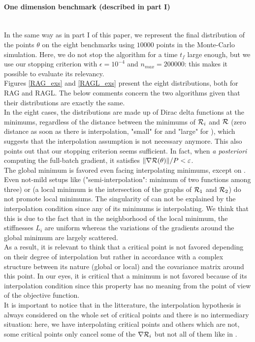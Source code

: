 \paragraph{One dimension benchmark (described in part I)}
~~\\
In the same way as in part I of this paper, we represent the final distribution of the points $\theta$ on the eight benchmarks using $10000$ points in the Monte-Carlo simulation. Here, we do not stop the algorithm for a time $t_f$ large enough, but we use our stopping criterion with $\epsilon=10^{-4}$ and $n_{max}=200000$: this makes it possible to evaluate its relevancy. 
\\
Figures \ref{RAG_exs} and \ref{RAGL_exs} present the eight distributions, both for RAG and RAGL. The below comments concern the two algorithms given that their distributions are exactly the same.\\
In the eight cases, the distributions are made up of Dirac delta functions at the minimums, regardless of the distance between the minimums of $\mathcal{R}_i$ and $\mathcal{R}$ (zero distance as
soon as there is interpolation, "small" for \exThree and "large" for \exFour), which suggests that the interpolation assumption is not necessary anymore. This also points out that
our stopping criterion seems sufficient. In fact, when {\em a posteriori} computing the full-batch gradient, it satisfies $\|\nabla \mathcal{R}(\theta)\|/P<\varepsilon$. \\
The global minimum is favored even facing interpolating minimums, except on \exHeight. Even not-mild setups like \exSix ("semi-interpolation": minimum of two functions among three) or \exThree (a local minimum is the intersection of the graphs of $\mathcal{R}_1$ and $\mathcal{R}_2$) do not promote local minimums. The singularity of \exHeight can not be explained by the interpolation condition since any of its minimums is interpolating. We think that this is due to the fact that in the neighborhood of the local minimum, the stiffnesses $L_i$ are uniform whereas the variations of the gradients around the global minimum are largely scattered. \\
As a result, it is relevant to think that a critical point is not favored depending on their degree of interpolation but rather in accordance with a complex structure between its nature (global or local) and the covariance matrix around this point. In our eyes, it is critical that a minimum is not favored because of its interpolation condition since this property has no meaning from the point of view of the objective function. \\
It is important to notice that in the litterature, the interpolation hypothesis is always considered on the whole set of critical points and there is no intermediary situation:
here, we have interpolating critical points and others which are not, some critical points only cancel some of the $\nabla \mathcal{R}_i$ but not all of them like in \exSix.     

